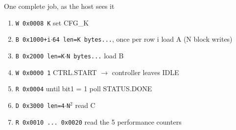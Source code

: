 \documentclass[aspectratio=169,11pt]{beamer}
\newcommand{\file}[1]{\texttt{\textcolor{copper}{#1}}}
\newcommand{\sig}[1]{\texttt{#1}}
\begin{document}
\begin{frame}{One complete job, as the host sees it}
  \small
  \begin{enumerate}
    \item \sig{W 0x0008 K} \hfill set CFG\_K
    \item \sig{B 0x1000+i$\cdot$64 len=K bytes...}, once per row i \hfill load A (N block writes)
    \item \sig{B 0x2000 len=K$\cdot$N bytes...} \hfill load B
    \item \sig{W 0x0000 1} \hfill CTRL.START $\to$ controller leaves IDLE
    \item \sig{R 0x0004} until bit1 = 1 \hfill poll STATUS.DONE
    \item \sig{D 0x3000 len=4$\cdot$N$^2$} \hfill read C
    \item \sig{R 0x0010 ... 0x0020} \hfill read the 5 performance counters
  \end{enumerate}
  \vspace{2mm}
\end{frame}
\end{document}
